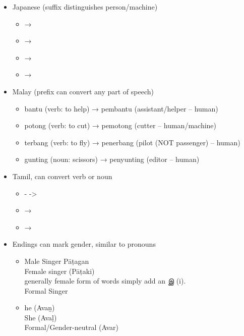 \documentclass[headrule,footrule]{foils}
\begin{document}

\begin{itemize}
\item Japanese (suffix distinguishes person/machine)
  \begin{itemize}
  \item {} → 
  \item {} →  
  \item {} →  
  \item {} →  
  \end{itemize}
\item Malay (prefix can convert any part  of speech)
  \begin{itemize}
  \item bantu (verb: to help) → pembantu (assistant/helper – human)
  \item potong (verb: to cut) → pemotong (cutter – human/machine)
  \item terbang (verb: to fly) → penerbang (pilot (NOT passenger) –
    human)
  \item gunting (noun: scissors) → penyunting (editor – human)
  \end{itemize}

\end{itemize}


\begin{itemize}
\item Tamil, can convert verb or noun
  \begin{itemize}
  \item  {}  - ->  
\item  {}  →  
\item {}  →  
  \end{itemize}
\item Endings can mark gender, similar to pronouns
  \begin{itemize}
  \item Male Singer    Pāṭagan
\\    Female singer   (Pāṭaki)
\\ generally female form of words simply add an இ (i).
\\    Formal Singer  
  \item  he  (Avaṉ)
  \\  She   (Avaḷ)
  \\  Formal/Gender-neutral   (Avar)
  \end{itemize}
\end{itemize}
\end{document}
